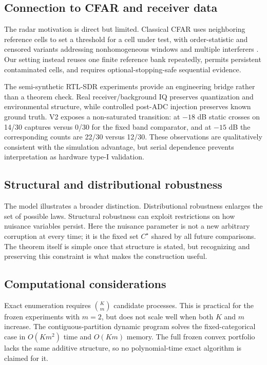 \subsection{Connection to CFAR and receiver data}

The radar motivation is direct but limited. Classical CFAR uses neighboring reference cells to set a threshold for a cell under test, with order-statistic and censored variants addressing nonhomogeneous windows and multiple interferers \cite{Rohling1983}. Our setting instead reuses one finite reference bank repeatedly, permits persistent contaminated cells, and requires optional-stopping-safe sequential evidence.

The semi-synthetic RTL-SDR experiments provide an engineering bridge rather than a theorem check. Real receiver/background IQ preserves quantization and environmental structure, while controlled post-ADC injection preserves known ground truth. V2 exposes a non-saturated transition: at \(-18\) dB static crosses on 14/30 captures versus 0/30 for the fixed band comparator, and at \(-15\) dB the corresponding counts are 22/30 versus 12/30. These observations are qualitatively consistent with the simulation advantage, but serial dependence prevents interpretation as hardware type-I validation.

\subsection{Structural and distributional robustness}

The model illustrates a broader distinction. Distributional robustness enlarges the set of possible laws. Structural robustness can exploit restrictions on how nuisance variables persist. Here the nuisance parameter is not a new arbitrary corruption at every time; it is the fixed set \(C^\star\) shared by all future comparisons. The theorem itself is simple once that structure is stated, but recognizing and preserving this constraint is what makes the construction useful.

\subsection{Computational considerations}

Exact enumeration requires
\(\binom{K}{m}\)
candidate processes. This is practical for the frozen experiments with \(m=2\), but does not scale well when both \(K\) and \(m\) increase. The contiguous-partition dynamic program solves the fixed-categorical case in \(O(Km^2)\) time and \(O(Km)\) memory. The full frozen convex portfolio lacks the same additive structure, so no polynomial-time exact algorithm is claimed for it.

